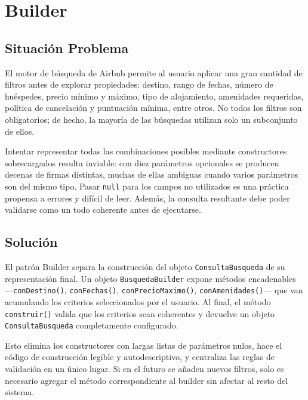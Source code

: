
\chapter{Builder}

\section{Situación Problema}

El motor de búsqueda de Airbnb permite al usuario aplicar una gran
cantidad de filtros antes de explorar propiedades: destino, rango de
fechas, número de huéspedes, precio mínimo y máximo, tipo de alojamiento,
amenidades requeridas, política de cancelación y puntuación mínima, entre
otros. No todos los filtros son obligatorios; de hecho, la mayoría de las
búsquedas utilizan solo un subconjunto de ellos.

Intentar representar todas las combinaciones posibles mediante constructores
sobrecargados resulta inviable: con diez parámetros opcionales se
producen decenas de firmas distintas, muchas de ellas ambiguas cuando
varios parámetros son del mismo tipo. Pasar \texttt{null} para los campos
no utilizados es una práctica propensa a errores y difícil de leer.
Además, la consulta resultante debe poder validarse como un todo coherente
antes de ejecutarse.

\section{Solución}

El patrón Builder separa la construcción del objeto \texttt{ConsultaBusqueda}
de su representación final. Un objeto \texttt{BusquedaBuilder} expone
métodos encadenables —\texttt{conDestino()}, \texttt{conFechas()},
\texttt{conPrecioMaximo()}, \texttt{conAmenidades()}— que van acumulando
los criterios seleccionados por el usuario. Al final, el método
\texttt{construir()} valida que los criterios sean coherentes y devuelve
un objeto \texttt{ConsultaBusqueda} completamente configurado.

Esto elimina los constructores con largas listas de parámetros nulos,
hace el código de construcción legible y autodescriptivo, y centraliza
las reglas de validación en un único lugar. Si en el futuro se añaden
nuevos filtros, solo es necesario agregar el método correspondiente al
builder sin afectar al resto del sistema.

